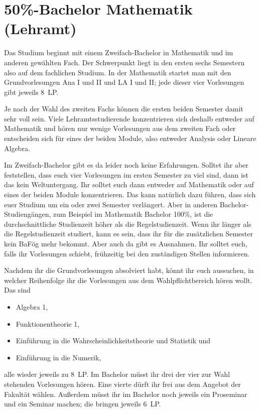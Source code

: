 \section{50\%-Bachelor Mathematik (Lehramt)}

Das Studium beginnt mit einem Zweifach-Bachelor in Mathematik und im anderen
gewählten Fach. Der Schwerpunkt liegt in den ersten sechs Semestern also auf
dem fachlichen Studium. In der Mathematik startet man mit den Grundvorlesungen
Ana I und II und LA I und II; jede dieser vier Vorlesungen gibt jeweils 8~LP.

Je nach der Wahl des zweiten Fachs können die ersten beiden Semester damit sehr
voll sein. Viele Lehramtsstudierende konzentrieren sich deshalb entweder auf
Mathematik und hören nur wenige Vorlesungen aus dem zweiten Fach oder
entscheiden sich für eines der beiden Module, also entweder Analysis oder
Lineare Algebra.

Im Zweifach-Bachelor gibt es da leider noch keine Erfahrungen. Solltet ihr
aber feststellen, dass euch vier Vorlesungen im ersten Semester zu viel sind,
dann ist das kein Weltuntergang. Ihr solltet euch dann entweder auf Mathematik
oder auf eines der beiden Module konzentrieren. Das kann natürlich dazu
führen, dass sich euer Studium um ein oder zwei Semester verlängert. Aber in
anderen Bachelor-Studiengängen, zum Beispiel im Mathematik Bachelor 100\%, ist
die durchschnittliche Studienzeit höher als die Regelstudienzeit.
Wenn ihr länger als die Regelstudienzeit studiert, kann es sein, dass ihr für
die zusätzlichen Semester kein BaFög mehr bekommt. Aber auch da gibt es
Ausnahmen. Ihr solltet euch, falls ihr Vorlesungen schiebt, frühzeitig bei den
zuständigen Stellen informieren.

Nachdem ihr die Grundvorlesungen absolviert habt, könnt ihr euch aussuchen, in
welcher Reihenfolge ihr die Vorlesungen aus dem Wahlpflichtbereich hören
wollt. Das sind
\begin{itemize}
  \item Algebra 1,
  \item Funktionentheorie 1,
  \item Einführung in die Wahrscheinlichkeitstheorie und Statistik und
  \item Einführung in die Numerik,
\end{itemize}
alle wieder jeweils zu 8~LP. Im Bachelor müsst ihr drei der vier zur Wahl
stehenden Vorlesungen hören. Eine vierte dürft ihr frei aus dem Angebot der
Fakultät wählen. Außerdem müsst ihr im Bachelor noch jeweils ein Proseminar und
ein Seminar machen; die bringen jeweils 6~LP.

